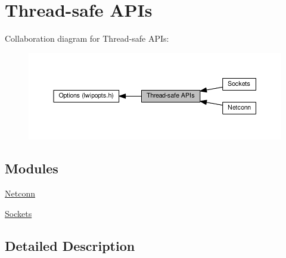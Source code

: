 \hypertarget{group__lwip__opts__threadsafe__apis}{}\section{Thread-\/safe A\+P\+Is}
\label{group__lwip__opts__threadsafe__apis}
Collaboration diagram for Thread-\/safe A\+P\+Is\+:
\nopagebreak
\begin{figure}[H]
\begin{center}
\leavevmode
\includegraphics[width=350pt]{group__lwip__opts__threadsafe__apis}
\end{center}
\end{figure}
\subsection*{Modules}
\begin{DoxyCompactItemize}
\item 
\hyperlink{group__lwip__opts__netconn}{Netconn}
\item 
\hyperlink{group__lwip__opts__socket}{Sockets}
\end{DoxyCompactItemize}


\subsection{Detailed Description}

